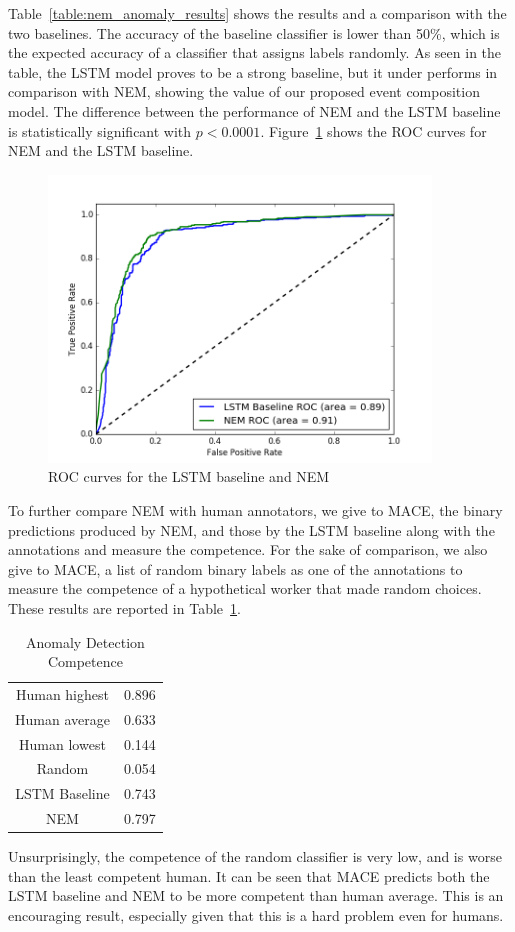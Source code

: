 Table~\ref{table:nem_anomaly_results} shows the results and a comparison with the two baselines.  The accuracy of the 
baseline classifier is lower than 50\%, which is the expected accuracy of a classifier that assigns labels randomly.  
As seen in the table, the LSTM model proves to be a strong baseline, but it under performs in comparison with NEM,
showing the value of our proposed event composition model. The difference between the performance of
NEM and the LSTM baseline is statistically significant with $p < 0.0001$. Figure~\ref{fig:nem_roc} shows the ROC curves
for NEM and the LSTM baseline.
\begin{figure}
  \begin{center}
  \includegraphics[width=4in]{figures/nem_roc.png}
  \caption{ROC curves for the LSTM baseline and NEM}
  \label{fig:nem_roc}
  \end{center}
\end{figure}


To further compare NEM with human annotators, we give to MACE, the binary predictions produced
by NEM, and those by the LSTM baseline along with the annotations and
measure the competence.  For the sake of comparison, we also give to MACE, a list of
random binary labels as one of the annotations 
to measure the competence of a hypothetical worker that made random choices. 
These results are reported in Table~\ref{table:nem_mace_competence}.
\begin{table}
\begin{center}
  \begin{tabular}[c]{|c|c|}
 \hline
 Human highest  & 0.896 \\
  Human average & 0.633 \\
  Human lowest & 0.144 \\
  \hline
  Random & 0.054 \\
  \hline
  LSTM Baseline & 0.743 \\
  NEM &  0.797 \\
  \hline
  \end{tabular}
\end{center}
 \caption{Anomaly Detection Competence}
 \label{table:nem_mace_competence}
\end{table}
Unsurprisingly, the competence of the random classifier is very low, and is worse than the least competent human.
It can be seen that MACE predicts both the LSTM baseline and NEM to be more competent than human average. This is an encouraging
result, especially given that this is a hard problem even for humans.


